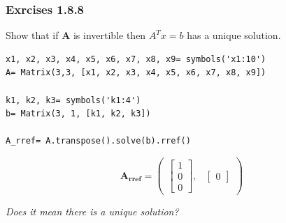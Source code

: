\subsubsection{Exrcises 1.8.8}

Show that if \textbf{A} is invertible then $A^Tx=b$ has a unique solution.

\begin{verbatim}
x1, x2, x3, x4, x5, x6, x7, x8, x9= symbols('x1:10')
A= Matrix(3,3, [x1, x2, x3, x4, x5, x6, x7, x8, x9])

k1, k2, k3= symbols('k1:4')
b= Matrix(3, 1, [k1, k2, k3])

A_rref= A.transpose().solve(b).rref()
\end{verbatim}

\begin{equation}
\mathbf{A_{rref}} = \begin{pmatrix}\left[\begin{matrix}1\\0\\0\end{matrix}\right], & \begin{bmatrix}0\end{bmatrix}\end{pmatrix}
\end{equation}

\textit{Does it mean there is a unique solution?}